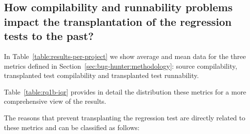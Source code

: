 \vspace{0.4cm}


\subsection{How compilability and runnability problems impact the transplantation of the regression tests to the past?}
\label{results:rq1b}

In Table~\ref{table:results-per-project} we show average and mean data for the three metrics defined in Section~\ref{sec:bug-hunter:methodology}: source compilability, transplanted test compilability and transplanted test runnability.



Table~\ref{table:rq1b-iqr} provides in detail the distribution these metrics for a more comprehensive view of the results. 



The reasons that prevent transplanting the regression test are directly related to these metrics and can be classified as follows:

